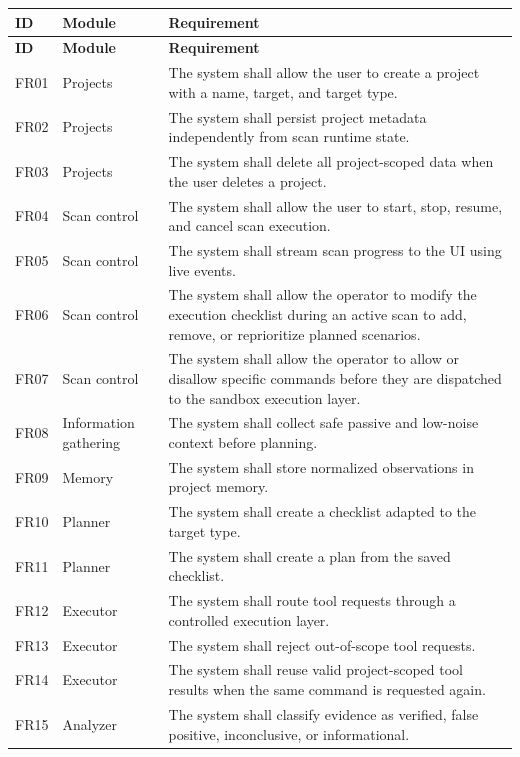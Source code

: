 \documentclass[12pt,a4paper]{report}
\begin{document}
\begin{longtable}{|p{}|p{}|p{}|}
\hline
\textbf{ID} & \textbf{Module} & \textbf{Requirement} \\
\hline
\endfirsthead
\hline
\textbf{ID} & \textbf{Module} & \textbf{Requirement} \\
\hline
\endhead
FR01 & Projects & The system shall allow the user to create a project with a
name, target, and target type. \\
\hline
FR02 & Projects & The system shall persist project metadata independently from
scan runtime state. \\
\hline
FR03 & Projects & The system shall delete all project-scoped data when the
user deletes a project. \\
\hline
FR04 & Scan control & The system shall allow the user to start, stop, resume,
and cancel scan execution. \\
\hline
FR05 & Scan control & The system shall stream scan progress to the UI using
live events. \\
\hline
FR06 & Scan control & The system shall allow the operator to modify the
execution checklist during an active scan to add, remove, or reprioritize
planned scenarios. \\
\hline
FR07 & Scan control & The system shall allow the operator to allow or disallow
specific commands before they are dispatched to the sandbox execution layer. \\
\hline
FR08 & Information gathering & The system shall collect safe passive and
low-noise context before planning. \\
\hline
FR09 & Memory & The system shall store normalized observations in project
memory. \\
\hline
FR10 & Planner & The system shall create a checklist adapted to the target
type. \\
\hline
FR11 & Planner & The system shall create a plan from the saved checklist. \\
\hline
FR12 & Executor & The system shall route tool requests through a controlled
execution layer. \\
\hline
FR13 & Executor & The system shall reject out-of-scope tool requests. \\
\hline
FR14 & Executor & The system shall reuse valid project-scoped tool results
when the same command is requested again. \\
\hline
FR15 & Analyzer & The system shall classify evidence as verified, false
positive, inconclusive, or informational. \\

\end{longtable}
\end{document}
